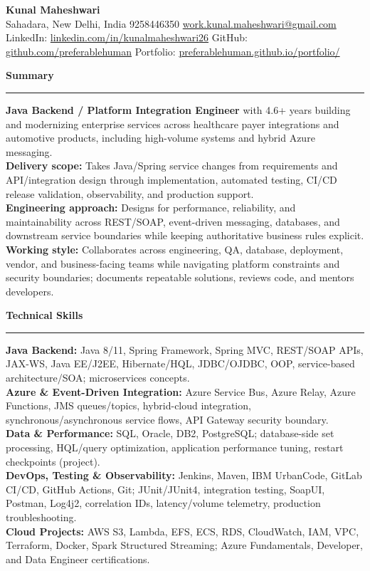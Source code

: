 \documentclass[11pt,letterpaper]{article}
\newcommand{\ressection}[1]{\Needspace{6\baselineskip}\vspace{8pt}\par\textbf{#1}\par\vspace{2pt}\hrule\vspace{5pt}}
\begin{document}
\pagestyle{empty}\raggedright\fontsize{11}{12.5}\selectfont

{\Large \textbf{Kunal Maheshwari}}\\
Sahadara, New Delhi, India \textbar{} 9258446350 \textbar{} \href{mailto:work.kunal.maheshwari@gmail.com}{work.kunal.maheshwari@gmail.com}\\
LinkedIn: \href{https://www.linkedin.com/in/kunalmaheshwari26}{linkedin.com/in/kunalmaheshwari26} \textbar{} GitHub: \href{https://github.com/preferablehuman}{github.com/preferablehuman} \textbar{} Portfolio: \href{https://preferablehuman.github.io/portfolio/}{preferablehuman.github.io/portfolio/}

\ressection{Summary}
\textbf{Java Backend / Platform Integration Engineer} with 4.6+ years building and modernizing enterprise services across healthcare payer integrations and automotive products, including high-volume systems and hybrid Azure messaging.\\[2pt]
\textbf{Delivery scope:} Takes Java/Spring service changes from requirements and API/integration design through implementation, automated testing, CI/CD release validation, observability, and production support.\\[2pt]
\textbf{Engineering approach:} Designs for performance, reliability, and maintainability across REST/SOAP, event-driven messaging, databases, and downstream service boundaries while keeping authoritative business rules explicit.\\[2pt]
\textbf{Working style:} Collaborates across engineering, QA, database, deployment, vendor, and business-facing teams while navigating platform constraints and security boundaries; documents repeatable solutions, reviews code, and mentors developers.

\ressection{Technical Skills}
\textbf{Java Backend:} Java 8/11, Spring Framework, Spring MVC, REST/SOAP APIs, JAX-WS, Java EE/J2EE, Hibernate/HQL, JDBC/OJDBC, OOP, service-based architecture/SOA; microservices concepts.\\
\textbf{Azure \& Event-Driven Integration:} Azure Service Bus, Azure Relay, Azure Functions, JMS queues/topics, hybrid-cloud integration, synchronous/asynchronous service flows, API Gateway security boundary.\\
\textbf{Data \& Performance:} SQL, Oracle, DB2, PostgreSQL; database-side set processing, HQL/query optimization, application performance tuning, restart checkpoints (project).\\
\textbf{DevOps, Testing \& Observability:} Jenkins, Maven, IBM UrbanCode, GitLab CI/CD, GitHub Actions, Git; JUnit/JUnit4, integration testing, SoapUI, Postman, Log4j2, correlation IDs, latency/volume telemetry, production troubleshooting.\\
\textbf{Cloud Projects:} AWS S3, Lambda, EFS, ECS, RDS, CloudWatch, IAM, VPC, Terraform, Docker, Spark Structured Streaming; Azure Fundamentals, Developer, and Data Engineer certifications.
\end{document}
